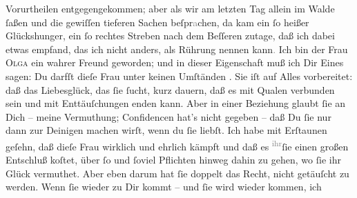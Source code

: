 \begin{ledgroupsized}[t]{13cm}
               Vorurtheilen {\pb}entgegengekommen; aber als wir am
               letzten Tag allein im Walde ſaßen und die gewiſſen tieferen Sachen
                  beſpr\textcolor{gray}{a}chen, da kam ein ſo heißer Glückshunger, ein ſo rechtes
               Streben nach dem Beſſeren zutage, daß ich dabei etwas empfand, das ich nicht anders,
               als Rührung nennen kann\textcolor{gray}{.} Ich bin der Frau \textsc{Olga} ein wahrer Freund geworden; und in dieser Eigenschaft muß ich Dir Eines sagen:
               Du darfſt dieſe Frau unter
               keinen Umſtänden \label{K_L02648-2v}\label{K_L02648-2h}. Sie iſt auf Alles vorbereitet: daß das Liebesglück, das
               ſie ſucht, kurz dauern, daß es mit Qualen verbunden sein und mit Enttäuſchungen enden
               kann. Aber in einer Beziehung glaubt ſie an Dich – meine Vermuthung; {\pb}Confidencen hat’s nicht gegeben – daß Du ſie nur
               dann zur Deinigen machen wirſt, wenn du ſie liebſt. Ich habe mit Erſtaunen geſehn,
               daß dieſe Frau wirklich und
               ehrlich kämpft und daß es \substVorne{}\textsuperscript{\textcolor{gray}{ihr}}\substDazwischen{}ſie\substHinten{} einen großen Entschluß koſtet, über ſo und ſoviel Pflichten hinweg dahin zu
               gehen, wo ſie ihr Glück vermuthet. Aber eben darum hat ſie doppelt das Recht, nicht
               getäuſcht zu werden. Wenn ſie wieder zu Dir kommt – und ſie wird wieder kommen, ich

\end{ledgroupsized}
